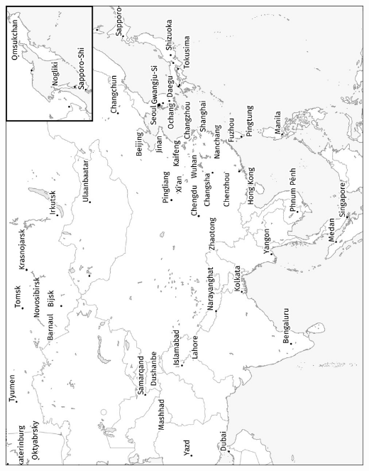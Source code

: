 \begin{minipage}{\textwidth} \includegraphics[width=\textwidth]{maps/Azio-orienta.jpg} \end{minipage}
